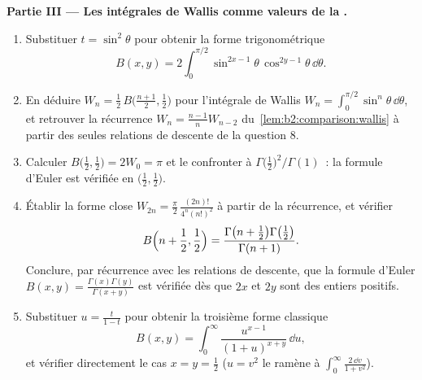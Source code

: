 \begin{problem}
\medskip
\noindent\textbf{Partie III --- Les intégrales de Wallis comme valeurs de la
.}
\begin{enumerate}[resume]
  \item Substituer $t = \sin^2\theta$ pour obtenir la forme trigonométrique
        \[
        B(x, y) = 2\int_0^{\pi/2}
        \sin^{2x-1}\theta\,\cos^{2y-1}\theta\,\dd\theta .
        \]
  \item En déduire $W_n = \frac12\,B\bigl(\frac{n+1}2, \frac12\bigr)$
        pour l'intégrale de Wallis $W_n = \int_0^{\pi/2}\sin^n
        \theta\,\dd\theta$, et retrouver la récurrence $W_n =
        \frac{n-1}{n}W_{n-2}$ du~\cref{lem:b2:comparison:wallis}
        à partir des seules relations de descente de la question 8.
  \item Calculer $B\bigl(\frac12, \frac12\bigr) = 2W_0 = \pi$ et
        le confronter à $\Gamma\bigl(\frac12\bigr)^2/\Gamma(1)$~:
        la formule d'Euler est vérifiée en $\bigl(\frac12,
        \frac12\bigr)$.
  \item Établir la forme close $W_{2n} = \frac\pi2\,
        \frac{(2n)!}{4^n(n!)^2}$ à partir de la récurrence, et vérifier
        \[
        B\Bigl(n + \frac12, \frac12\Bigr)
        = \frac{\Gamma\bigl(n + \frac12\bigr)\Gamma\bigl(
        \frac12\bigr)}{\Gamma(n+1)} .
        \]
        Conclure, par récurrence avec les relations de descente, que
        la formule d'Euler $B(x,y) =
        \frac{\Gamma(x)\Gamma(y)}{\Gamma(x+y)}$ est vérifiée dès que $2x$
        et $2y$ sont des entiers positifs.
  \item Substituer $u = \frac{t}{1-t}$ pour obtenir la troisième
        forme classique
        \[
        B(x,y) = \int_0^\infty
        \frac{u^{x-1}}{(1+u)^{x+y}}\,\dd u ,
        \]
        et vérifier directement le cas $x = y = \frac12$ ($u = v^2$
        le ramène à $\int_0^\infty\frac{2\,\dd v}{1+v^2}$).
\end{enumerate}


\end{problem}
